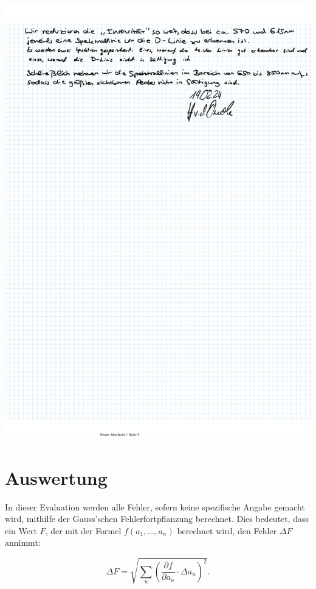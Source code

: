 \documentclass{article}
\begin{document}
\includegraphics[width=\textwidth]{graphics/mess2.jpeg}
\newpage

\addtocounter{table}{3}

\newpage
\section{Auswertung}

In dieser Evaluation werden alle Fehler, sofern keine spezifische Angabe gemacht wird, mithilfe der Gauss'schen Fehlerfortpflanzung berechnet. Dies bedeutet, dass ein Wert $F$, der mit der Formel $f(a_1, ..., a_n)$ berechnet wird, den Fehler $\Delta F$ annimmt:

\begin{equation}
    \Delta F = \sqrt{\sum_n \left( \frac{\partial f}{\partial a_n} \cdot \Delta a_n \right)^2}.
\end{equation}
\end{document}
